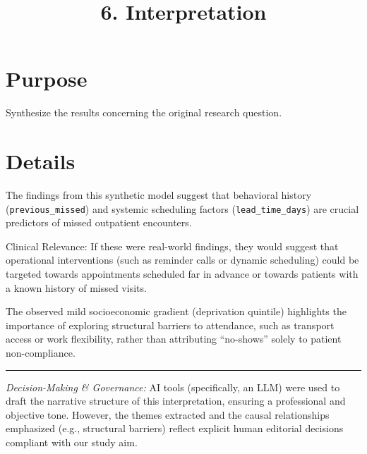 \documentclass[
]{report}
\title{6. Interpretation}
\author{}
\date{}
\renewcommand*\contentsname{Table of contents}
\newcommand\contentsname{Table of contents}
\begin{document}
\maketitle

\renewcommand*\contentsname{Table of contents}
{
\hypersetup{linkcolor=}
\setcounter{tocdepth}{2}
\tableofcontents
}

\chapter{Purpose}\label{purpose}

Synthesize the results concerning the original research question.

\chapter{Details}\label{details}

The findings from this synthetic model suggest that behavioral history
(\texttt{previous\_missed}) and systemic scheduling factors
(\texttt{lead\_time\_days}) are crucial predictors of missed outpatient
encounters.

Clinical Relevance: If these were real-world findings, they would
suggest that operational interventions (such as reminder calls or
dynamic scheduling) could be targeted towards appointments scheduled far
in advance or towards patients with a known history of missed visits.

The observed mild socioeconomic gradient (deprivation quintile)
highlights the importance of exploring structural barriers to
attendance, such as transport access or work flexibility, rather than
attributing ``no-shows'' solely to patient non-compliance.

\begin{center}\rule{0.5\linewidth}{0.5pt}\end{center}

\begin{tcolorbox}[enhanced jigsaw, opacitybacktitle=0.6, arc=.35mm, colback=white, bottomrule=.15mm, breakable, toprule=.15mm, toptitle=1mm, titlerule=0mm, opacityback=0, colbacktitle=quarto-callout-note-color!10!white, bottomtitle=1mm, rightrule=.15mm, coltitle=black, leftrule=.75mm, left=2mm, colframe=quarto-callout-note-color-frame, title=\textcolor{quarto-callout-note-color}{\faInfo}\hspace{0.5em}{AI Capability Checkpoint}]

\emph{Decision-Making \& Governance:} AI tools (specifically, an LLM)
were used to draft the narrative structure of this interpretation,
ensuring a professional and objective tone. However, the themes
extracted and the causal relationships emphasized (e.g., structural
barriers) reflect explicit human editorial decisions compliant with our
study aim.

\end{tcolorbox}
\end{document}
